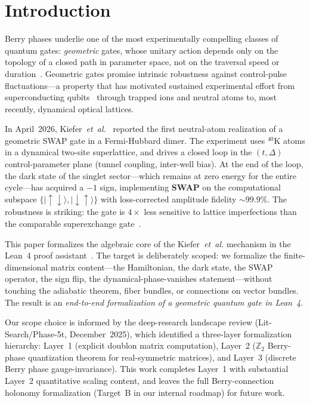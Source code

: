 \documentclass[aps,prd,twocolumn,showpacs,superscriptaddress,nofootinbib]{revtex4-2}
\newcommand{\ket}[1]{|#1\rangle}
\begin{document}
\section{Introduction}
\label{sec:intro}

Berry phases underlie one of the most experimentally compelling classes
of quantum gates: \emph{geometric} gates, whose unitary action depends
only on the topology of a closed path in parameter space, not on the
traversal speed or duration~\cite{Berry1984,Zanardi1999}. Geometric gates
promise intrinsic robustness against control-pulse fluctuations---a
property that has motivated sustained experimental effort from
superconducting qubits~\cite{Leek2007} through trapped ions and neutral
atoms to, most recently, dynamical optical lattices.

In April~2026, Kiefer~\textit{et~al.}~\cite{Kiefer2026} reported the
first neutral-atom realization of a geometric SWAP gate in a
Fermi-Hubbard dimer. The experiment uses ${}^{40}$K atoms in a dynamical
two-site superlattice, and drives a closed loop in the $(t, \Delta)$
control-parameter plane (tunnel coupling, inter-well bias). At the end
of the loop, the dark state of the singlet sector---which remains at
zero energy for the entire cycle---has acquired a $-1$ sign,
implementing \textbf{SWAP} on the computational subspace
$\{\ket{\uparrow\downarrow}, \ket{\downarrow\uparrow}\}$ with
loss-corrected amplitude fidelity $\sim 99.9\%$. The robustness is
striking: the gate is $4\times$ less sensitive to lattice imperfections
than the comparable superexchange gate~\cite{Kiefer2026}.

This paper formalizes the algebraic core of the Kiefer~\textit{et~al.}
mechanism in the Lean~4 proof assistant~\cite{Lean4,Mathlib}. The
target is deliberately scoped: we formalize the finite-dimensional
matrix content---the Hamiltonian, the dark state, the SWAP operator,
the sign flip, the dynamical-phase-vanishes statement---without
touching the adiabatic theorem, fiber bundles, or connections on
vector bundles. The result is an \emph{end-to-end formalization of a
geometric quantum gate in Lean~4}.

Our scope choice is informed by the deep-research landscape review
(Lit-Search/Phase-5t, December~2025), which identified a three-layer
formalization hierarchy: Layer~1 (explicit doublon matrix computation),
Layer~2 ($\mathbb{Z}_2$ Berry-phase quantization theorem for
real-symmetric matrices), and Layer~3 (discrete Berry phase
gauge-invariance). This work completes Layer~1 with substantial Layer~2
quantitative scaling content, and leaves the full Berry-connection
holonomy formalization (Target~B in our internal roadmap) for
future work.
\end{document}
